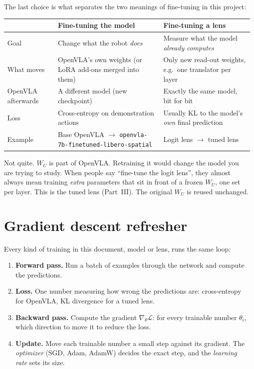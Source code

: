 \documentclass[11pt]{article}
\begin{document}
The last choice is what separates the two meanings of fine-tuning in this project:

\begin{center}
\begin{tabularx}{\linewidth}{@{}lXX@{}}
\toprule
 & Fine-tuning the model & Fine-tuning a lens \\
\midrule
Goal & Change what the robot \emph{does} & Measure what the model \emph{already computes} \\
What moves & OpenVLA's own weights (or LoRA add-ons merged into them) & Only new read-out weights, e.g.\ one translator per layer \\
OpenVLA afterwards & A different model (new checkpoint) & Exactly the same model, bit for bit \\
Loss & Cross-entropy on demonstration actions & Usually KL to the model's \emph{own} final prediction \\
Example & Base OpenVLA $\to$ \texttt{openvla-7b-finetuned-\allowbreak libero-spatial} & Logit lens $\to$ tuned lens \\
\bottomrule
\end{tabularx}
\end{center}

\begin{pitfall}
Not quite. $W_U$ is part of OpenVLA. Retraining it would change the model you are trying to study. When people say ``fine-tune the logit lens'', they almost always mean training \emph{extra} parameters that sit in front of a frozen $W_U$, one set per layer. This is the tuned lens (Part~III). The original $W_U$ is reused unchanged.
\end{pitfall}

\section{Gradient descent refresher}

Every kind of training in this document, model or lens, runs the same loop:

\begin{enumerate}
  \item \textbf{Forward pass.} Run a batch of examples through the network and compute the predictions.
  \item \textbf{Loss.} One number measuring how wrong the predictions are: cross-entropy for OpenVLA, KL divergence for a tuned lens.
  \item \textbf{Backward pass.} Compute the gradient $\nabla_\theta \mathcal{L}$: for every trainable number $\theta_i$, which direction to move it to reduce the loss.
  \item \textbf{Update.} Move each trainable number a small step against its gradient. The \emph{optimizer} (SGD, Adam, AdamW) decides the exact step, and the \emph{learning rate} sets its size.
\end{enumerate}
\end{document}
